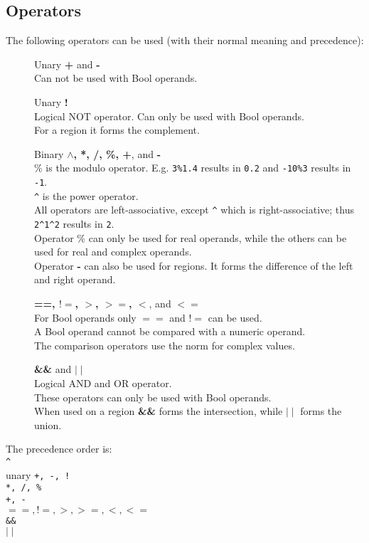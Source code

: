 \subsection{\label{LEL:OPERATORS}Operators}
The following operators can be used (with their normal meaning and
precedence):
\begin{description}
  \item[] Unary \textbf{+} and \textbf{-}
       \\Can not be used with Bool operands.
  \item[] Unary \textbf{!}
       \\Logical NOT operator.
       Can only be used with Bool operands.
       \\For a region it forms the complement.
  \item[] Binary \textbf{$\wedge$, *, /, \%, +}, and \textbf{-}
       \\\% is the modulo operator.
       E.g. \texttt{3\%1.4} results in \texttt{0.2} and
       \texttt{-10\%3} results in \texttt{-1}.
       \\\verb+^+ is the power operator.
       \\All operators are left-associative, except \verb+^+ which is
       right-associative; thus
       \texttt{2}\verb+^+\texttt{1}\verb+^+\texttt{2} results in \texttt{2}.
       \\Operator \% can only be used for real operands, while the others
       can be used for real and complex operands.
        \\Operator \textbf{-} can also be used for regions. It forms
        the difference of the left and right operand.
  \item[] \textbf{==, $!=$, $>$, $>=$, $<$}, and \textbf{$<=$}
       \\For Bool operands only $==$ and $!=$ can be used.
       \\A Bool operand cannot be compared with a numeric operand.
       \\The comparison operators use the norm for complex values.
  \item[] \textbf{\&\&} and \textbf{$\mid\mid$}
       \\Logical AND and OR operator. 
       \\These operators can only be used with Bool operands.
       \\When used on a region \textbf{\&\&} forms the intersection,
       while \textbf{$\mid\mid$} forms the union.
\end{description}
\begin{description}
  \item The precedence order is:
       \\\verb+^+
       \\unary \texttt{+, -, !}
       \\\texttt{*, /, \%}
       \\\texttt{+, -}
       \\\texttt{$==, !=, >, >=, <, <=$}
       \\\texttt{\&\&}
       \\\texttt{$\mid\mid$}
\end{description}

